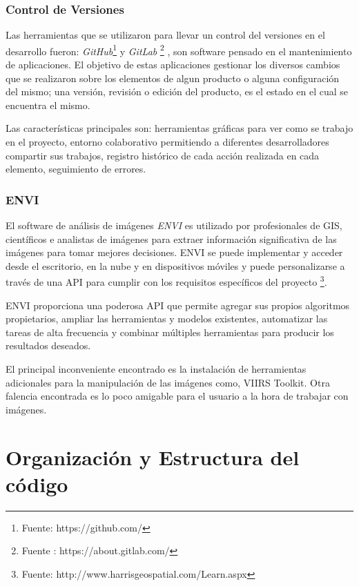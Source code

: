 \subsubsection*{Control de Versiones}

Las herramientas que se utilizaron para llevar un control del versiones en el desarrollo fueron: \textit{GitHub}\footnote{Fuente: https://github.com/} 
y \textit{GitLab} \footnote{Fuente : https://about.gitlab.com/} , son software pensado en el mantenimiento de aplicaciones. El objetivo de estas 
aplicaciones gestionar los diversos cambios que se realizaron sobre los elementos de algun producto o alguna configuración del mismo; una versión, 
revisión o edición del producto, es el estado en el cual se encuentra el mismo.

Las características principales son: herramientas gráficas para ver como se trabajo en el proyecto, entorno colaborativo permitiendo a diferentes 
desarrolladores compartir sus trabajos, registro histórico de cada acción realizada en cada elemento, seguimiento de errores.

\subsubsection*{ENVI}\label{sub:enviSoft}
El software de análisis de imágenes \textit{ENVI} es utilizado por profesionales de GIS, científicos e analistas de imágenes para extraer información 
significativa de las imágenes para tomar mejores decisiones. ENVI se puede implementar y acceder desde el escritorio, en la nube y en dispositivos 
móviles y puede personalizarse a través de una API para cumplir con los requisitos específicos del proyecto \footnote{Fuente: 
http://www.harrisgeospatial.com/Learn.aspx}.

ENVI proporciona una poderosa API que permite agregar sus propios algoritmos propietarios, ampliar las herramientas y modelos existentes, automatizar 
las tareas de alta frecuencia y combinar múltiples herramientas para producir los resultados deseados.

El principal inconveniente encontrado es la instalación de herramientas adicionales para la manipulación de las imágenes como, VIIRS Toolkit. Otra 
falencia encontrada es lo poco amigable para el usuario a la hora de trabajar con imágenes.

\section{Organización y Estructura del código}\label{sec:estructuracodigo}

